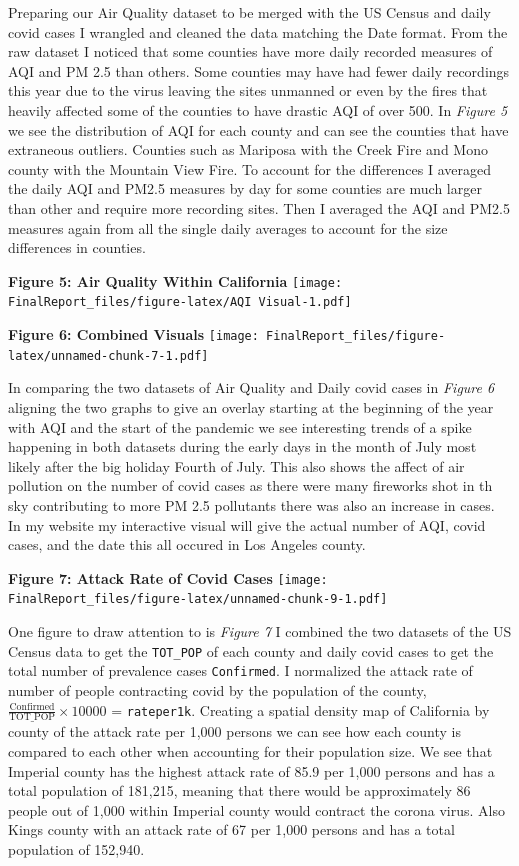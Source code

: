 \documentclass[
]{article}
\begin{document}
Preparing our Air Quality dataset to be merged with the US Census and
daily covid cases I wrangled and cleaned the data matching the Date
format. From the raw dataset I noticed that some counties have more
daily recorded measures of AQI and PM 2.5 than others. Some counties may
have had fewer daily recordings this year due to the virus leaving the
sites unmanned or even by the fires that heavily affected some of the
counties to have drastic AQI of over 500. In \emph{Figure 5} we see the
distribution of AQI for each county and can see the counties that have
extraneous outliers. Counties such as Mariposa with the Creek Fire and
Mono county with the Mountain View Fire. To account for the differences
I averaged the daily AQI and PM2.5 measures by day for some counties are
much larger than other and require more recording sites. Then I averaged
the AQI and PM2.5 measures again from all the single daily averages to
account for the size differences in counties.

\textbf{Figure 5: Air Quality Within California}
\texttt{[image: FinalReport\_files/figure-latex/AQI Visual-1.pdf]}

\textbf{Figure 6: Combined Visuals}
\texttt{[image: FinalReport\_files/figure-latex/unnamed-chunk-7-1.pdf]}

In comparing the two datasets of Air Quality and Daily covid cases in
\emph{Figure 6} aligning the two graphs to give an overlay starting at
the beginning of the year with AQI and the start of the pandemic we see
interesting trends of a spike happening in both datasets during the
early days in the month of July most likely after the big holiday Fourth
of July. This also shows the affect of air pollution on the number of
covid cases as there were many fireworks shot in th sky contributing to
more PM 2.5 pollutants there was also an increase in cases. In my
website my interactive visual will give the actual number of AQI, covid
cases, and the date this all occured in Los Angeles county.

\textbf{Figure 7: Attack Rate of Covid Cases}
\texttt{[image: FinalReport\_files/figure-latex/unnamed-chunk-9-1.pdf]}

One figure to draw attention to is \emph{Figure 7} I combined the two
datasets of the US Census data to get the \texttt{TOT\_POP} of each
county and daily covid cases to get the total number of prevalence cases
\texttt{Confirmed}. I normalized the attack rate of number of people
contracting covid by the population of the county,
\(\frac{\text{Confirmed}}{\text{TOT_POP}} \times 10000\) =
\texttt{rateper1k}. Creating a spatial density map of California by
county of the attack rate per 1,000 persons we can see how each county
is compared to each other when accounting for their population size. We
see that Imperial county has the highest attack rate of 85.9 per 1,000
persons and has a total population of 181,215, meaning that there would
be approximately 86 people out of 1,000 within Imperial county would
contract the corona virus. Also Kings county with an attack rate of 67
per 1,000 persons and has a total population of 152,940.
\end{document}
